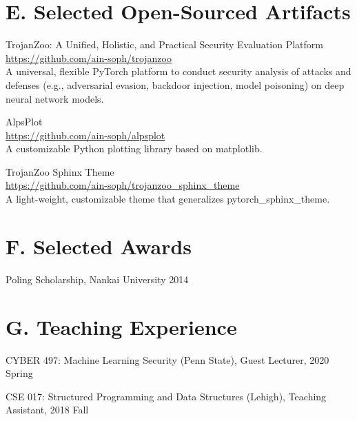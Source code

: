 \documentclass{resume}
\begin{document}
\begin{resume}
\begin{enumerate}[labelsep=18pt, parsep=8pt]
\end{enumerate}

\vspace{0.2in} 
\section{E. Selected Open-Sourced Artifacts}
\vspace{8pt}



TrojanZoo: A Unified, Holistic, and Practical Security Evaluation Platform\\
\url{https://github.com/ain-soph/trojanzoo} \\
A universal, flexible PyTorch platform to conduct security analysis of attacks and defenses (e.g., adversarial evasion, backdoor injection, model poisoning) on deep neural network models. 

AlpsPlot \\
\url{https://github.com/ain-soph/alpsplot} \\
A customizable Python plotting library based on matplotlib.


TrojanZoo Sphinx Theme \\
\url{https://github.com/ain-soph/trojanzoo_sphinx_theme} \\
A light-weight, customizable theme that generalizes pytorch\_sphinx\_theme. 




\vspace{0.2in} 
\section{F. Selected Awards}
\vspace{8pt}

Poling Scholarship, Nankai University   \hfill 2014



\vspace{0.2in} 
\section{G. Teaching Experience}
\vspace{8pt}

CYBER 497: Machine Learning Security (Penn State), Guest Lecturer, 2020 Spring

CSE 017: Structured Programming and Data Structures (Lehigh), Teaching Assistant, 2018 Fall





\end{resume} 
\end{document}
